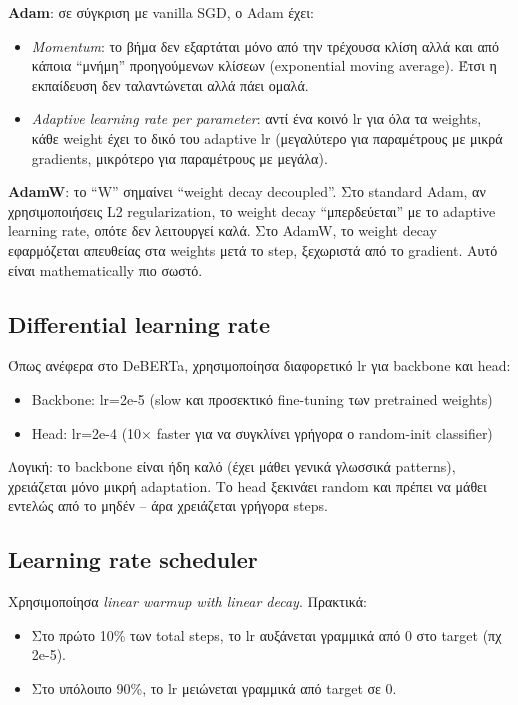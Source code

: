 \documentclass[12pt]{fphw}
\begin{document}
\textbf{Adam}: σε σύγκριση με vanilla SGD, ο Adam έχει:
\begin{itemize}
    \item \emph{Momentum}: το βήμα δεν εξαρτάται μόνο από την τρέχουσα κλίση αλλά και από κάποια ``μνήμη'' προηγούμενων κλίσεων (exponential moving average). Έτσι η εκπαίδευση δεν ταλαντώνεται αλλά πάει ομαλά.
    \item \emph{Adaptive learning rate per parameter}: αντί ένα κοινό lr για όλα τα weights, κάθε weight έχει το δικό του adaptive lr (μεγαλύτερο για παραμέτρους με μικρά gradients, μικρότερο για παραμέτρους με μεγάλα).
\end{itemize}

\textbf{AdamW}: το ``W'' σημαίνει ``weight decay decoupled''. Στο standard Adam, αν χρησιμοποιήσεις L2 regularization, το weight decay ``μπερδεύεται'' με το adaptive learning rate, οπότε δεν λειτουργεί καλά. Στο AdamW, το weight decay εφαρμόζεται απευθείας στα weights μετά το step, ξεχωριστά από το gradient. Αυτό είναι mathematically πιο σωστό.

\subsection{Differential learning rate}

Όπως ανέφερα στο DeBERTa, χρησιμοποίησα διαφορετικό lr για backbone και head:

\begin{itemize}
    \item Backbone: lr=2e-5 (slow και προσεκτικό fine-tuning των pretrained weights)
    \item Head: lr=2e-4 (10× faster για να συγκλίνει γρήγορα ο random-init classifier)
\end{itemize}

Λογική: το backbone είναι ήδη καλό (έχει μάθει γενικά γλωσσικά patterns), χρειάζεται μόνο μικρή adaptation. Το head ξεκινάει random και πρέπει να μάθει εντελώς από το μηδέν -- άρα χρειάζεται γρήγορα steps.

\subsection{Learning rate scheduler}

Χρησιμοποίησα \emph{linear warmup with linear decay}. Πρακτικά:

\begin{itemize}
    \item Στο πρώτο 10\% των total steps, το lr αυξάνεται γραμμικά από 0 στο target (πχ 2e-5).
    \item Στο υπόλοιπο 90\%, το lr μειώνεται γραμμικά από target σε 0.
\end{itemize}
\end{document}
